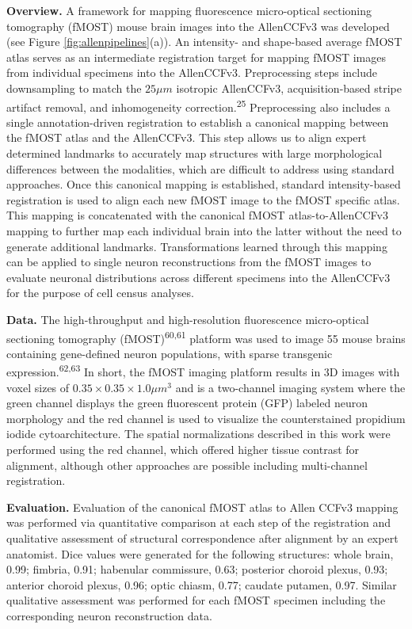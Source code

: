 \documentclass[
  12pt,
]{article}
\begin{document}
\textbf{Overview.} A framework for mapping fluorescence micro-optical
sectioning tomography (fMOST) mouse brain images into the AllenCCFv3 was
developed (see Figure \ref{fig:allenpipelines}(a)). An intensity- and
shape-based average fMOST atlas serves as an intermediate registration
target for mapping fMOST images from individual specimens into the
AllenCCFv3. Preprocessing steps include downsampling to match the
\(25 \mu m\) isotropic AllenCCFv3, acquisition-based stripe artifact
removal, and inhomogeneity correction.\textsuperscript{25} Preprocessing
also includes a single annotation-driven registration to establish a
canonical mapping between the fMOST atlas and the AllenCCFv3. This step
allows us to align expert determined landmarks to accurately map
structures with large morphological differences between the modalities,
which are difficult to address using standard approaches. Once this
canonical mapping is established, standard intensity-based registration
is used to align each new fMOST image to the fMOST specific atlas. This
mapping is concatenated with the canonical fMOST atlas-to-AllenCCFv3
mapping to further map each individual brain into the latter without the
need to generate additional landmarks. Transformations learned through
this mapping can be applied to single neuron reconstructions from the
fMOST images to evaluate neuronal distributions across different
specimens into the AllenCCFv3 for the purpose of cell census analyses.

\textbf{Data.} The high-throughput and high-resolution fluorescence
micro-optical sectioning tomography (fMOST)\textsuperscript{60,61}
platform was used to image 55 mouse brains containing gene-defined
neuron populations, with sparse transgenic
expression.\textsuperscript{62,63} In short, the fMOST imaging platform
results in 3D images with voxel sizes of
\(0.35 \times 0.35 \times 1.0 \mu m^3\) and is a two-channel imaging
system where the green channel displays the green fluorescent protein
(GFP) labeled neuron morphology and the red channel is used to visualize
the counterstained propidium iodide cytoarchitecture. The spatial
normalizations described in this work were performed using the red
channel, which offered higher tissue contrast for alignment, although
other approaches are possible including multi-channel registration.

\textbf{Evaluation.} Evaluation of the canonical fMOST atlas to Allen
CCFv3 mapping was performed via quantitative comparison at each step of
the registration and qualitative assessment of structural correspondence
after alignment by an expert anatomist. Dice values were generated for
the following structures: whole brain, 0.99; fimbria, 0.91; habenular
commissure, 0.63; posterior choroid plexus, 0.93; anterior choroid
plexus, 0.96; optic chiasm, 0.77; caudate putamen, 0.97. Similar
qualitative assessment was performed for each fMOST specimen including
the corresponding neuron reconstruction data.
\end{document}
